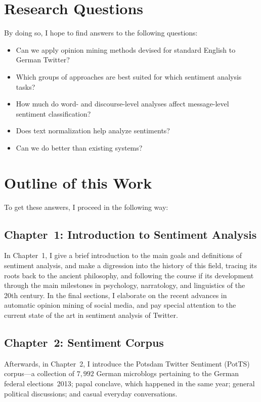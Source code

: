 \documentclass[11pt]{article}
\begin{document}
\section{Research Questions}

By doing so, I hope to find answers to the following questions:
\begin{itemize}
\item Can we apply opinion mining methods devised for standard English
  to German Twitter?
\item Which groups of approaches are best suited for which sentiment
  analysis tasks?
\item How much do word- and discourse-level analyses affect
  message-level sentiment classification?
\item Does text normalization help analyze sentiments?
\item Can we do better than existing systems?
\end{itemize}

\section{Outline of this Work}

To get these answers, I proceed in the following way:

\subsection{Chapter~1: Introduction to Sentiment Analysis}

In Chapter~1, I give a brief introduction to the main goals and
definitions of sentiment analysis, and make a digression into the
history of this field, tracing its roots back to the ancient
philosophy, and following the course if its development through the
main milestones in psychology, narratology, and linguistics of the
20th century.  In the final sections, I elaborate on the recent
advances in automatic opinion mining of social media, and pay special
attention to the current state of the art in sentiment analysis of
Twitter.

\subsection{Chapter~2: Sentiment Corpus}

Afterwards, in Chapter~2, I introduce the Potsdam Twitter Sentiment
(PotTS) corpus---a collection of $7,992$ German microblogs pertaining
to the German federal elections~2013; papal conclave, which happened
in the same year; general political discussions; and casual everyday
conversations.
\end{document}
